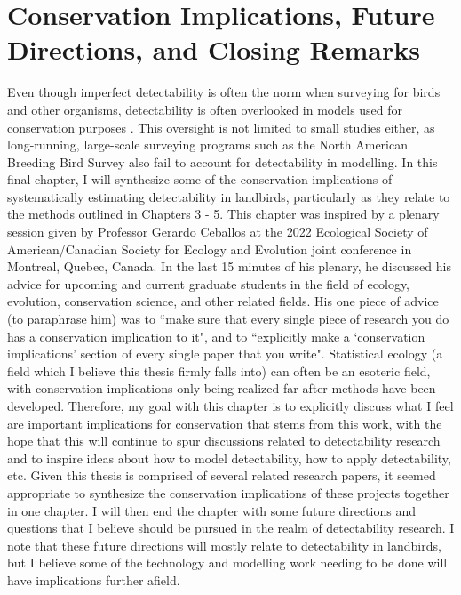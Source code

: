 \chapter{Conservation Implications, Future Directions, and Closing Remarks}

\par Even though imperfect detectability is often the norm when surveying for birds and other organisms, detectability is often overlooked in models used for conservation purposes \citep{bennett_how_2024}.
This oversight is not limited to small studies either, as long-running, large-scale surveying programs such as the North American Breeding Bird Survey also fail to account for detectability in modelling.
In this final chapter, I will synthesize some of the conservation implications of systematically estimating detectability in landbirds, particularly as they relate to the methods outlined in Chapters 3 - 5. 
This chapter was inspired by a plenary session given by Professor Gerardo Ceballos at the 2022 Ecological Society of American/Canadian Society for Ecology and Evolution joint conference in Montreal, Quebec, Canada.
In the last 15 minutes of his plenary, he discussed his advice for upcoming and current graduate students in the field of ecology, evolution, conservation science, and other related fields.
His one piece of advice (to paraphrase him) was to ``make sure that every single piece of research you do has a conservation implication to it", and to ``explicitly make a `conservation implications' section of every single paper that you write".
Statistical ecology (a field which I believe this thesis firmly falls into) can often be an esoteric field, with conservation implications only being realized far after methods have been developed.
Therefore, my goal with this chapter is to explicitly discuss what I feel are important implications for conservation that stems from this work, with the hope that this will continue to spur discussions related to detectability research and to inspire ideas about how to model detectability, how to apply detectability, etc.
Given this thesis is comprised of several related research papers, it seemed appropriate to synthesize the conservation implications of these projects together in one chapter.
I will then end the chapter with some future directions and questions that I believe should be pursued in the realm of detectability research.
I note that these future directions will mostly relate to detectability in landbirds, but I believe some of the technology and modelling work needing to be done will have implications further afield.

